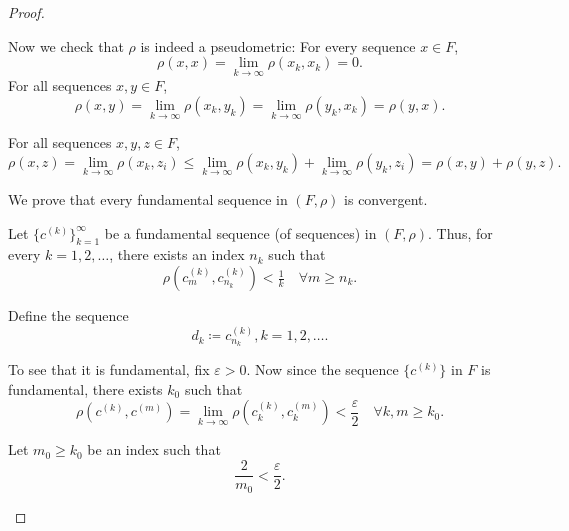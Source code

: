 \begin{proof}
\begin{ThmEnum}
    Now we check that \( \rho \) is indeed a pseudometric:
     For every sequence \( x \in F \),
    \begin{equation*}
      \rho(x, x) = \lim_{k \to \infty} \rho(x_k, x_k) = 0.
    \end{equation*}
     For all sequences \( x, y \in F \),
    \begin{equation*}
      \rho(x, y) = \lim_{k \to \infty} \rho(x_k, y_k) = \lim_{k \to \infty} \rho(y_k, x_k) = \rho(y, x).
    \end{equation*}

     For all sequences \( x, y, z \in F \),
    \begin{equation*}
      \rho(x, z) = \lim_{k \to \infty} \rho(x_k, z_i) \leq \lim_{k \to \infty} \rho(x_k, y_k) + \lim_{k \to \infty} \rho(y_k, z_i) = \rho(x, y) + \rho(y, z).
    \end{equation*}

     We prove that every fundamental sequence in \( (F, \rho) \) is convergent.

    Let \( \{ c^{(k)} \}_{k=1}^\infty \) be a fundamental sequence (of sequences) in \( (F, \rho) \). Thus, for every \( k = 1, 2, \ldots \), there exists an index \( n_k \) such that
    \begin{equation*}
      \rho(c_m^{(k)}, c_{n_k}^{(k)}) < \tfrac 1 k \quad\forall m \geq n_k.
    \end{equation*}

    Define the sequence
    \begin{equation*}
      d_k \coloneqq c_{n_k}^{(k)}, k = 1, 2, \ldots.
    \end{equation*}

    To see that it is fundamental, fix \( \varepsilon > 0 \). Now since the sequence \( \{ c^{(k)} \} \) in \( F \) is fundamental, there exists \( k_0 \) such that
    \begin{equation*}
      \rho(c^{(k)}, c^{(m)}) = \lim_{k \to \infty} \rho(c_k^{(k)}, c_k^{(m)}) < \frac \varepsilon 2 \quad\forall k, m \geq k_0.
    \end{equation*}

    Let \( m_0 \geq k_0 \) be an index such that
    \begin{equation*}
      \frac 2 {m_0} < \frac \varepsilon 2.
    \end{equation*}


\end{ThmEnum}
\end{proof}
